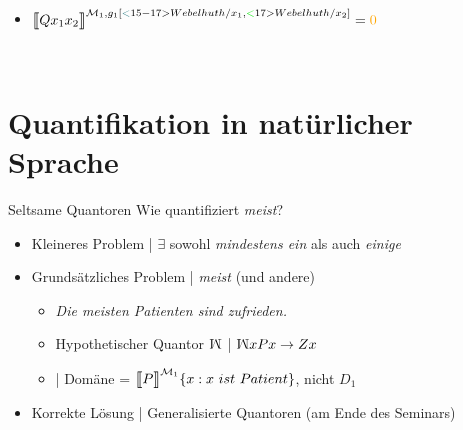 \begin{frame}
\begin{minipage}{0.5\textwidth}
\begin{itemize}[<+->]
\begin{itemize}[<+->]
              \item $\dem{Qx_1x_2}^{\mMm_1,g_1[\tuerkis<15-17>{Webelhuth/x_1},\gruen<17>{Webelhuth/x_2}]}=\orongsch{0}$
            \end{itemize}
      \end{itemize}\end{minipage}%
      \begin{minipage}{0.5\textwidth}%
      \centering 
      \\
    \end{minipage}
  \end{frame}
\fi

\section{Quantifikation in natürlicher Sprache}

\begin{frame}
  {Seltsame Quantoren}
  \onslide<+->
  \onslide<+->
  Wie quantifiziert \textit{meist}?\\
  \Halbzeile
  \begin{itemize}[<+->]
    \item Kleineres Problem | $\exists$ sowohl \textit{mindestens ein} als auch \textit{einige}
      \Halbzeile
    \item Grundsätzliches Problem | \textit{meist} (und andere)
      \begin{itemize}[<+->]
        \item[ ] \textit{Die meisten Patienten sind zufrieden.}
        \item Hypothetischer Quantor \alert{$\rotatebox[origin=c]{180}{M}$} | \alert{$\rotatebox[origin=c]{180}{M}xPx\rightarrow Zx$}\\
        \item {}| Domäne = $\dem{P}^{\Model_1}\{x:x\ ist\ Patient\}$, nicht $D_1$
      \end{itemize}
      \Halbzeile
    \item Korrekte Lösung | \alert{Generalisierte Quantoren} (am Ende des Seminars)
  \end{itemize}
\end{frame}

